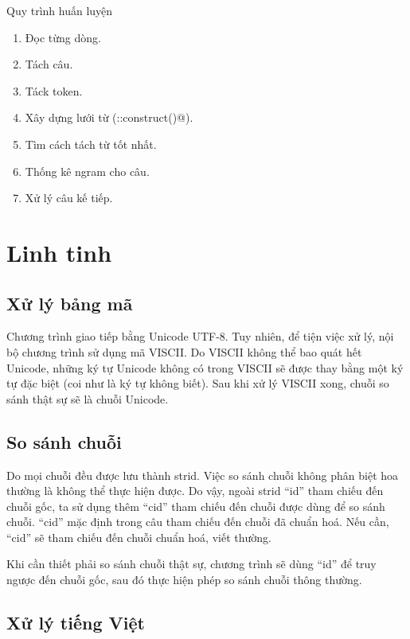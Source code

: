 \documentclass[a4paper,oneside,14pt]{extbook} %
\begin{document}
\begin{algo}
  \caption{Quy trình huấn luyện}
  \label{algo:training}
  \begin{enumerate}
  \item Đọc từng dòng.
  \item Tách câu.
  \item Táck token.
  \item Xây dựng lưới từ (\verb@Lattice::construct()@).
  \item Tìm cách tách từ tốt nhất.
  \item Thống kê ngram cho câu.
  \item Xử lý câu kế tiếp.
  \end{enumerate}
\end{algo}

\section{Linh tinh}

\subsection{Xử lý bảng mã}

Chương trình giao tiếp bằng Unicode UTF-8. Tuy nhiên, để tiện việc xử
lý, nội bộ chương trình sử dụng mã VISCII. Do VISCII không thể bao
quát hết Unicode, những ký tự Unicode không có trong VISCII sẽ được
thay bằng một ký tự đặc biệt (coi như là ký tự không biết). Sau khi xử
lý VISCII xong, chuỗi so sánh thật sự sẽ là chuỗi Unicode.

\subsection{So sánh chuỗi}

Do mọi chuỗi đều được lưu thành strid. Việc so sánh chuỗi không phân biệt 
hoa thường là không thể thực hiện được. Do vậy, ngoài strid ``id'' tham chiếu
đến chuỗi gốc, ta sử dụng thêm ``cid'' tham chiếu đến chuỗi được dùng để
so sánh chuỗi. ``cid'' mặc định trong câu tham chiếu đến chuỗi đã
chuẩn hoá. Nếu cần, ``cid'' sẽ tham chiếu đến chuỗi chuẩn hoá, viết
thường.

Khi cần thiết phải so sánh chuỗi thật sự, chương trình sẽ dùng ``id''
để truy ngược đến chuỗi gốc, sau đó thực hiện phép so sánh chuỗi thông thường.

\subsection{Xử lý tiếng Việt}
\end{document}
